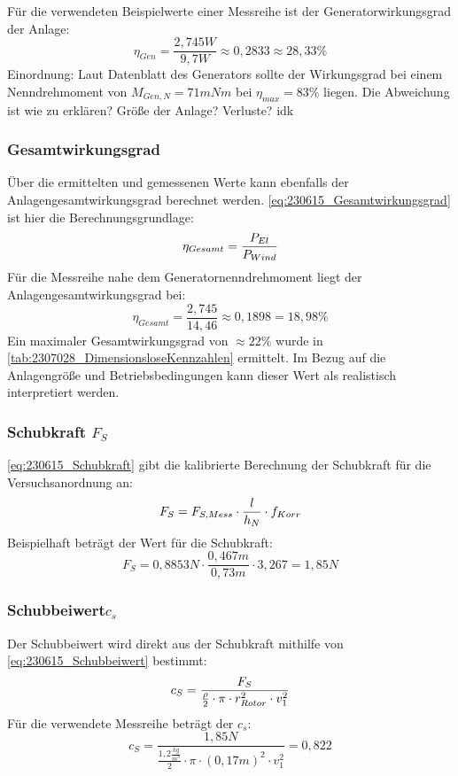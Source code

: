 Für die verwendeten Beispielwerte einer Messreihe ist der Generatorwirkungsgrad der Anlage:
$$\eta_{Gen} = \frac{2,745W}{9,7W} \approx 0,2833 \approx 28,33\% $$
Einordnung:
Laut Datenblatt des Generators sollte der Wirkungsgrad bei einem Nenndrehmoment von $M_{Gen,N}= 71 mNm$ bei $\eta_{max}=83\%$ liegen.
Die Abweichung ist wie zu erklären? Größe der Anlage? Verluste? idk
\subsubsection*{Gesamtwirkungsgrad}
Über die ermittelten und gemessenen Werte kann ebenfalls der Anlagengesamtwirkungsgrad berechnet werden.
\autoref{eq:230615_Gesamtwirkungsgrad} ist hier die Berechnungsgrundlage:
\begin{equation}
    \centering
    \eta_{Gesamt} = \frac{P_{El}}{P_{Wind}}
    \label{eq:230615_Gesamtwirkungsgrad}
\end{equation}
Für die Messreihe nahe dem Generatornenndrehmoment liegt der Anlagengesamtwirkungsgrad bei:
$$\eta_{Gesamt} = \frac{2,745}{14,46}\approx 0,1898 = 18,98\%$$
Ein maximaler Gesamtwirkungsgrad von $\approx 22\%$ wurde in \autoref{tab:2307028_DimensionsloseKennzahlen} ermittelt.
Im Bezug auf die Anlagengröße und Betriebsbedingungen kann dieser Wert als realistisch interpretiert werden.
\subsubsection*{Schubkraft $F_S$}
\autoref{eq:230615_Schubkraft} gibt die kalibrierte Berechnung der Schubkraft für die Versuchsanordnung an:
\begin{equation}
    \centering
    F_S = F_{S,Mess} \cdot \frac{l}{h_N} \cdot f_{Korr}
    \label{eq:230615_Schubkraft}
\end{equation}
Beispielhaft beträgt der Wert für die Schubkraft:
$$F_S = 0,8853N \cdot \frac{0,467m}{0,73m} \cdot 3,267 = 1,85N$$
\subsubsection*{Schubbeiwert$c_s$}
Der Schubbeiwert wird direkt aus der Schubkraft mithilfe von \autoref{eq:230615_Schubbeiwert} bestimmt:
\begin{equation}
    \centering
    c_S = \frac{F_S}{\frac{\rho}{2} \cdot \pi \cdot r_{Rotor}^2 \cdot v_1^2}
    \label{eq:230615_Schubbeiwert}
\end{equation}
Für die verwendete Messreihe beträgt der $c_s$:
$$c_S = \frac{1,85N}{\frac{1,2 \frac{kg}{m^3}}{2} \cdot \pi \cdot (0,17 m)^2 \cdot v_1^2} = 0,822$$


